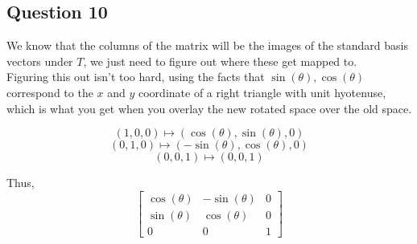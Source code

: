 \documentclass{article}
\begin{document}
\subsection*{Question 10}
We know that the columns of the matrix will be the images of the standard basis vectors
under \(T\), we just need to figure out where these get mapped to.
\\

Figuring this out isn't too hard, using the facts that \(\sin(\theta), \cos(\theta)\) correspond to the 
\(x\) and \(y\) coordinate of a right triangle with unit hyotenuse, which is what you get when you overlay 
the new rotated space over the old space.

\[
(1,0,0) \mapsto (\cos(\theta) ,\sin(\theta) , 0) 
\]
\[
(0,1,0) \mapsto (-\sin(\theta) ,\cos(\theta) , 0)
\]
\[
(0,0,1) \mapsto (0,0,1) 
\]

Thus,
\[
\begin{bmatrix}
    \cos(\theta) & -\sin(\theta) & 0 \\
    \sin(\theta) & \cos(\theta) & 0 \\
    0 & 0 & 1
\end{bmatrix}
\]
\end{document}
